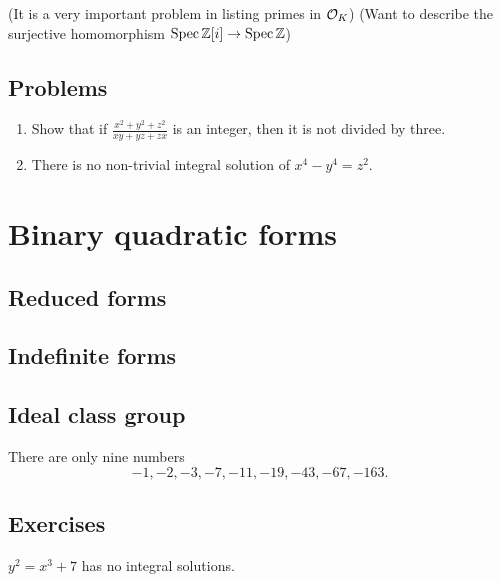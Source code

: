 \documentclass{../../large}
\begin{document}
\begin{prb}
(It is a very important problem in listing primes in $\mathcal{O}_K$)
(Want to describe the surjective homomorphism $\operatorname{Spec}\mathbb{Z}[i]\to\operatorname{Spec}\mathbb{Z}$)
\end{prb}



\section*{Problems}

\begin{enumerate}
\item Show that if $\frac{x^2+y^2+z^2}{xy+yz+zx}$ is an integer, then it is not divided by three.
\item There is no non-trivial integral solution of $x^4-y^4=z^2$.
\end{enumerate}




\chapter{Binary quadratic forms}
\section{Reduced forms}
\section{Indefinite forms}

\section{Ideal class group}

\begin{prb}
There are only nine numbers
\[-1,-2,-3,-7,-11,-19,-43,-67,-163.\]
\end{prb}

\section*{Exercises}
\begin{prb}
\begin{parts}
\item $y^2=x^3+7$ has no integral solutions.
\end{parts}
\end{prb}
\end{document}
